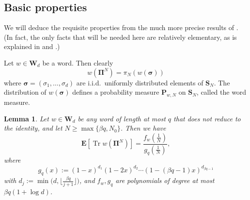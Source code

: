\documentclass[10pt,reqno]{amsart}
\newtheorem{lem}[thm]{Lemma}
\theoremstyle{definition}
\theoremstyle{remark}
\numberwithin{equation}{section}
\numberwithin{figure}{section}
\numberwithin{table}{section}
\newcommand{\tr}{\mathop{\mathrm{Tr}}}
\begin{document}
\subsection{Basic properties}

We will deduce the requisite properties from the much more precise results 
of \cite{HP23}. (In fact, the only facts that will be needed here are 
relatively elementary, as is explained in \cite[Remark 31]{PL10} and 
\cite[\S 1.5.1]{HP23}.)

Let $w\in\mathbf{W}_d$ be a word. Then clearly
$$
	w(\boldsymbol{\Pi}^N) = \pi_N(w(\boldsymbol{\sigma}))
$$
where $\boldsymbol{\sigma}=(\sigma_1,\ldots,\sigma_d)$ are i.i.d.\ 
uniformly distributed elements of $\mathbf{S}_N$.
The distribution of $w(\boldsymbol{\sigma})$ defines a probability measure
$\mathbf{P}_{w,N}$ on $\mathbf{S}_N$, called the word measure.

\begin{lem}
\label{lem:stabrational}
Let $w\in\mathbf{W}_d$ be any word of length at most $q$ that does
not reduce to the identity, and let $N\ge \max\{\beta q, N_0\}$. Then we have
$$
        \mathbf{E}[\tr w(\boldsymbol{\Pi}^N)] =
	\frac{f_w(\tfrac{1}{N})}{g_q(\tfrac{1}{N})},
$$
where
$$
	g_q(x) :=
	(1-x)^{d_1}(1-2x)^{d_2}\cdots 
	(1-(\beta q-1)x)^{d_{\beta q-1}}
$$
with $d_j := \min\big(d,\lfloor \frac{\beta q}{j+1}\rfloor\big)$, 
and $f_w,g_q$ are polynomials of degree at most $\beta q(1+\log d)$.
\end{lem}
\end{document}
